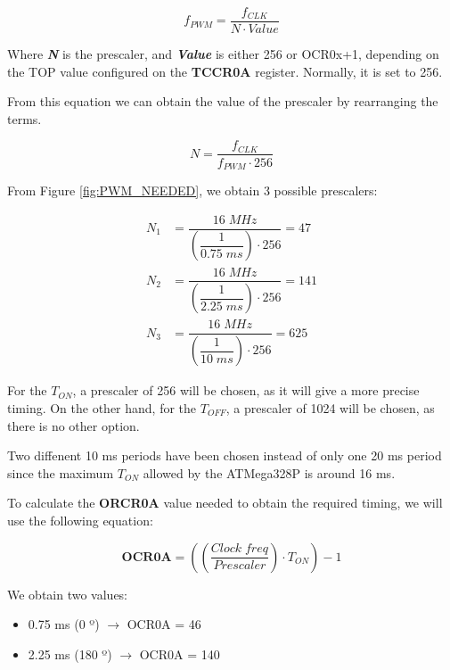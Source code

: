 \begin{equation*}
    f_{PWM} = \dfrac{f_{CLK}}{N \cdot \mathit{Value}}
\end{equation*}\medskip

\noindent Where \textbf{\textit{N}} is the prescaler, and \textbf{\textit{Value}} is either 256 or OCR0x+1, depending on the TOP value configured on the \textbf{TCCR0A} register. Normally, it is set to 256. \medskip

\clearpage

\noindent From this equation we can obtain the value of the prescaler by rearranging the terms.

\begin{equation*}
    N = \dfrac{f_{CLK}}{f_{PWM} \cdot 256}
\end{equation*}\medskip

\noindent From Figure \ref{fig:PWM_NEEDED}, we obtain 3 possible prescalers:

\begin{align*}
    N_{1} &= \dfrac{16 \; MHz}{ \left( \dfrac{1}{0.75 \; ms}\right) \cdot 256} = 47  \\[10pt]
    N_{2} &= \dfrac{16 \; MHz}{ \left( \dfrac{1}{2.25 \; ms}\right) \cdot 256} = 141 \\[10pt]
    N_{3} &= \dfrac{16 \; MHz}{ \left( \dfrac{1}{10 \; ms}\right) \cdot 256} = 625
\end{align*}

For the $T_{ON}$, a prescaler of 256 will be chosen, as it will give a more precise timing. On the other hand, for the $T_{OFF}$, a prescaler of 1024 will be chosen, as there is no other option.\medskip

Two diffenent 10 ms periods have been chosen instead of only one 20 ms period since the maximum $T_{ON}$ allowed by the ATMega328P is around 16 ms.\medskip

To calculate the \textbf{ORCR0A} value needed to obtain the required timing, we will use the following equation:

\begin{equation*}
    \mathbf{OCR0A} = \left( \left(\dfrac{Clock\;freq}{Prescaler}\right) \cdot  T_{ON} \right) - 1 
\end{equation*}

We obtain two values:

\begin{itemize}
    \item 0.75 ms (0 º) $\rightarrow$ OCR0A = 46
    \item 2.25 ms (180 º) $\rightarrow$ OCR0A = 140
\end{itemize}

